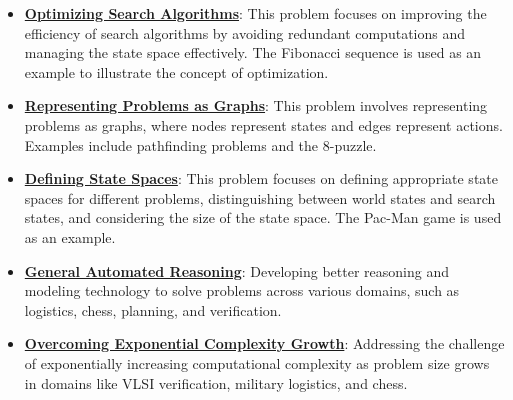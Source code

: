\documentclass{article}%
\begin{document}
\begin{itemize}[leftmargin=*]
\item \href{https://purdue.brightspace.com/d2l/common/assets/pdfjs-d2l-dist/1.0.14-legacy/web/viewer.html?file=%2Fcontent%2Fenforced%2F1095467-wl.202510.CS.24300.001%2F14L1-DepthFS.pdf%3Fou%3D1095467&lang=en-us&container=d2l-fileviewer-rendered-pdf&fullscreen=d2l-fileviewer-rendered-pdf-dialog&height=667#page=21}{\textbf{Optimizing Search Algorithms}}: This problem focuses on improving the efficiency of search algorithms by avoiding redundant computations and managing the state space effectively. The Fibonacci sequence is used as an example to illustrate the concept of optimization.%
\item \href{https://purdue.brightspace.com/d2l/common/assets/pdfjs-d2l-dist/1.0.14-legacy/web/viewer.html?file=%2Fcontent%2Fenforced%2F1095467-wl.202510.CS.24300.001%2F14L1-DepthFS.pdf%3Fou%3D1095467&lang=en-us&container=d2l-fileviewer-rendered-pdf&fullscreen=d2l-fileviewer-rendered-pdf-dialog&height=667#page=25}{\textbf{Representing Problems as Graphs}}: This problem involves representing problems as graphs, where nodes represent states and edges represent actions. Examples include pathfinding problems and the 8-puzzle.%
\item \href{https://purdue.brightspace.com/d2l/common/assets/pdfjs-d2l-dist/1.0.14-legacy/web/viewer.html?file=%2Fcontent%2Fenforced%2F1095467-wl.202510.CS.24300.001%2F14L1-DepthFS.pdf%3Fou%3D1095467&lang=en-us&container=d2l-fileviewer-rendered-pdf&fullscreen=d2l-fileviewer-rendered-pdf-dialog&height=667#page=37}{\textbf{Defining State Spaces}}: This problem focuses on defining appropriate state spaces for different problems, distinguishing between world states and search states, and considering the size of the state space. The Pac-Man game is used as an example.%
\item \href{https://purdue.brightspace.com/d2l/common/assets/pdfjs-d2l-dist/1.0.14-legacy/web/viewer.html?file=%2Fcontent%2Fenforced%2F1095467-wl.202510.CS.24300.001%2F15L2-SAT.pdf%3Fou%3D1095467&lang=en-us&container=d2l-fileviewer-rendered-pdf&fullscreen=d2l-fileviewer-rendered-pdf-dialog&height=667#page=3}{\textbf{General Automated Reasoning}}: Developing better reasoning and modeling technology to solve problems across various domains, such as logistics, chess, planning, and verification.%
\item \href{https://purdue.brightspace.com/d2l/common/assets/pdfjs-d2l-dist/1.0.14-legacy/web/viewer.html?file=%2Fcontent%2Fenforced%2F1095467-wl.202510.CS.24300.001%2F15L2-SAT.pdf%3Fou%3D1095467&lang=en-us&container=d2l-fileviewer-rendered-pdf&fullscreen=d2l-fileviewer-rendered-pdf-dialog&height=667#page=4}{\textbf{Overcoming Exponential Complexity Growth}}: Addressing the challenge of exponentially increasing computational complexity as problem size grows in domains like VLSI verification, military logistics, and chess.%

\end{itemize}
\end{document}
